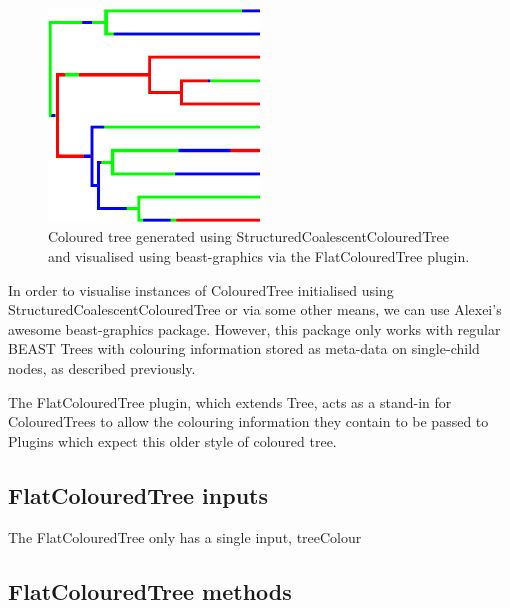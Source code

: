 \documentclass[a4paper,11pt]{paper}
\newcommand{\class}[1]{\textsf{#1}}
\newcommand{\project}[1]{\textsf{#1}}
\newcommand{\inp}[1]{\textsf{\color{blue}#1}}
\begin{document}
\begin{figure}
	\centering
	\includegraphics[width=0.5\textwidth]{structuredCoalescentFig.pdf}
	\caption{Coloured tree generated using
		\class{StructuredCoalescentColouredTree} and visualised using
	\project{beast-graphics} via the \class{FlatColouredTree} plugin.}
	\label{fig:structuredCoalescent}
\end{figure}

In order to visualise instances of \class{ColouredTree} initialised
using \class{StructuredCoalescentColouredTree} or via some other
means, we can use Alexei's awesome \project{beast-graphics} package.
However, this package only works with regular BEAST \class{Tree}s
with colouring information stored as meta-data on single-child nodes,
as described previously.

The \class{FlatColouredTree} plugin, which extends \class{Tree}, acts
as a stand-in for \class{ColouredTree}s to allow the colouring
information they contain to be passed to \class{Plugin}s which expect
this older style of coloured tree.

\subsection{FlatColouredTree inputs}

The \class{FlatColouredTree} only has a single input, \inp{treeColour}

\subsection{FlatColouredTree methods}
\end{document}

